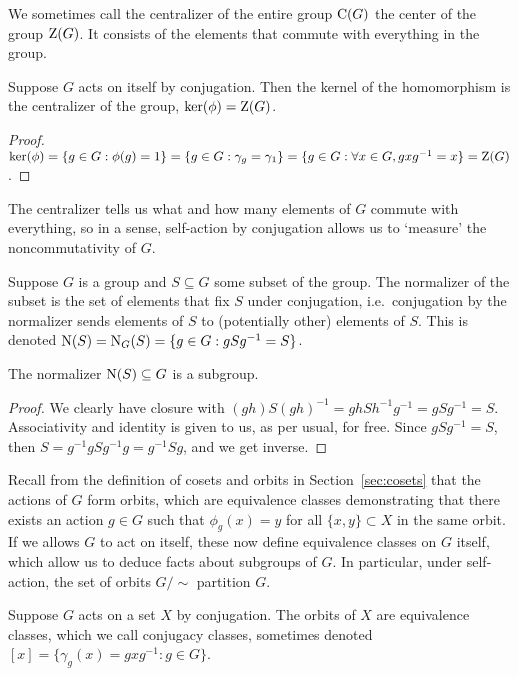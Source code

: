 \begin{definition}
    We sometimes call the centralizer of the entire group \(\operatorname{C}(G)\)
    the center of the group \(\operatorname{Z}(G)\).
    It consists of the elements that commute with everything in the group.
\end{definition}
\begin{proposition}
    Suppose \(G\) acts on itself by conjugation.
    Then the kernel of the homomorphism is the centralizer of the group,
    \(\ker(\phi) = \operatorname{Z}(G)\).
\end{proposition}
\begin{proof}
    \(\ker(\phi) = \{g \in G : \phi(g) = 1\}
    = \{g \in G : \gamma_g = \gamma_1\}
    = \{g \in G : \forall x \in G, gxg^{-1} = x\}
    = \operatorname{Z}(G)\).
\end{proof}
\begin{remark}
    The centralizer tells us what and how many elements of \(G\)
    commute with everything,
    so in a sense, self-action by conjugation
    allows us to `measure' the noncommutativity of \(G\).
\end{remark}

\begin{definition}
    Suppose \(G\) is a group
    and \(S \subseteq G\) some subset of the group.
    The normalizer of the subset
    is the set of elements that fix \(S\) under conjugation,
    i.e.\ conjugation by the normalizer sends elements of \(S\)
    to (potentially other) elements of \(S\).
    This is denoted \(\operatorname{N}(S) = \operatorname{N}_G(S)
    = \{g \in G : gSg^{-1} = S\}\).
\end{definition}
\begin{proposition}\label{prop:normalizer-subgroup}
    The normalizer \(\operatorname{N}(S) \subseteq G\) is a subgroup.
\end{proposition}
\begin{proof}
    We clearly have closure with
    \((gh)S{(gh)}^{-1} = ghSh^{-1}g^{-1} = gSg^{-1} = S\).
    Associativity and identity is given to us,
    as per usual, for free.
    Since \(gSg^{-1} = S\),
    then \(S = g^{-1}gSg^{-1}g = g^{-1}Sg\),
    and we get inverse.
\end{proof}

\begin{remark}
    Recall from the definition of cosets and orbits
    in Section~\ref{sec:cosets}
    that the actions of \(G\) form orbits,
    which are equivalence classes demonstrating that
    there exists an action \(g \in G\)
    such that \(\phi_g(x) = y\)
    for all \(\{x,y\} \subset X\) in the same orbit.
    If we allows \(G\) to act on itself,
    these now define equivalence classes on \(G\) itself,
    which allow us to deduce facts about subgroups of \(G\).
    In particular, under self-action,
    the set of orbits \(G/{\sim}\) partition \(G\).
\end{remark}
\begin{definition}
    Suppose \(G\) acts on a set \(X\) by conjugation.
    The orbits of \(X\) are equivalence classes,
    which we call conjugacy classes,
    sometimes denoted \([x] = \{\gamma_g(x) = gxg^{-1} : g \in G\}\).
\end{definition}

